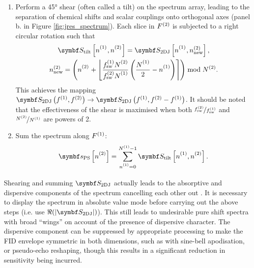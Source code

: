 \begin{enumerate}
    \item Perform a \ang{45} shear (often called a tilt) on the spectrum array,
        leading to the separation of chemical shifts and scalar couplings onto
        orthogonal axes  (panel b. in Figure \ref{fig:jres_spectrum}). Each
        slice in $F^{(2)}$ is subjected to a right circular rotation such that
        \begin{subequations}
            \begin{gather}
                \jresspectilt\left[{\none}\vpsub{\mathrm{sw}},{\ntwo}\vpsub{\mathrm{sw}}\right] =
                \jresspec\left[{\none}\vpsub{\mathrm{sw}},\ntwonew\right],\\
                \ntwonew = \left(
                    {\ntwo}\vpsub{\mathrm{new}} + \left\lfloor
                        \frac
                            {\fswone \Ntwo\vpsub{\mathrm{sw}}}
                            {\fswtwo \None\vpsub{\mathrm{sw}}}
                        \left(
                            \frac{\None\vpsub{\mathrm{sw}}}{2} - \none
                        \right)
                    \right\rceil
                \right) \bmod \Ntwo.
            \end{gather}
        \end{subequations}
        This achieves the mapping $\jresspec\left(\fone,\ftwo\right)
        \rightarrow \jresspec\left(\fone, \ftwo - \fone\right)$.  It should be
        noted that the effectiveness of the shear is maximised when both
        $\nicefrac{f_{\mathrm{sw}}^{(2)}}{f_{\mathrm{sw}}^{(1)}}$ and $\nicefrac{N^{(2)}}{N^{(1)}}$ are powers
        of 2.
    \item Sum the spectrum along $F^{(1)}$:
        \begin{equation}
            \specps\idxntwo =
            \sum_{\none=0}^{\None-1} \jresspectilt\idxnonentwo.
        \end{equation}
\end{enumerate}%
Shearing and summing $\jresspec$ actually leads to the absorptive and dispersive
components of the spectrum cancelling each other out . It is necessary to display
the spectrum in absolute value mode before carrying out the above steps (i.e.
use $\Re(\lvert \jresspec \rvert)$).
This still leads to undesirable pure shift spectra with broad ``wings'' on
account of the presence of dispersive character. The dispersive component can
be suppressed by appropriate processing to make the FID envelope symmetric in
both dimensions, such as with sine-bell
apodisation\cite[Section3.3.5]{Lindon1980}, or pseudo-echo
reshaping\cite{Bax1981}, though this results in a significant reduction in
sensitivity being incurred.


